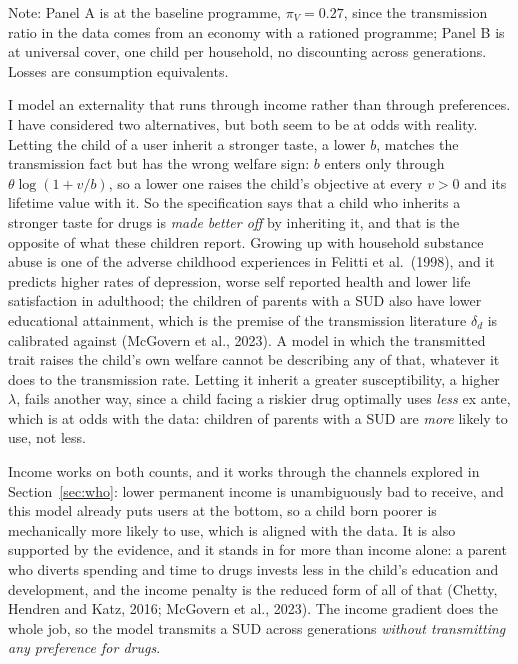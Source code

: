 \documentclass[10pt]{article}
\newcommand{\notes}[2]{\par\vspace{0.4em}%
  \begin{minipage}{#1}\footnotesize #2\end{minipage}}
\newcommand{\tabnote}[1]{\notes{\wd\ntbox}{#1}}
\begin{document}
\begin{table}[!tb]
\centering
\caption{The externality on children}\label{tab:children}
\sbox{\ntbox}{}\usebox{\ntbox}
\tabnote{Note: Panel A is at the baseline programme, $\pi_V=0.27$,
since the transmission ratio in the data comes from an economy with a rationed
programme; Panel B is at universal cover, one child per household, no
discounting across generations. Losses are consumption equivalents.}
\end{table}

I model an externality that runs through income rather than through
preferences. I have considered two alternatives, but both seem to be at odds
with reality. Letting the child of a user inherit a stronger taste, a lower $b$,
matches the transmission fact but has the wrong welfare sign: $b$ enters only
through $\theta\log(1+v/b)$, so a lower one raises the child's objective at every
$v>0$ and its lifetime value with it. So the specification says that a child
who inherits a stronger taste for drugs is \emph{made better off} by inheriting
it, and that is the opposite of what these children report. Growing up with
household substance abuse is one of the adverse childhood experiences in Felitti
et al.\ (1998), and it predicts higher rates of depression, worse self reported
health and lower life satisfaction in adulthood; the children of parents with a
SUD also have lower educational attainment, which is the premise of the
transmission literature $\delta_d$ is calibrated against (McGovern et al., 2023).
A model in which the transmitted trait raises the child's own welfare cannot be
describing any of that, whatever it does to the transmission rate. Letting it inherit a greater
susceptibility, a higher $\lambda$, fails another way, since a child facing a
riskier drug optimally uses \emph{less} ex ante, which is at odds with the
data: children of parents with a SUD are \emph{more} likely to use, not less.

Income works on both counts, and it works through the channels explored in
Section~\ref{sec:who}: lower permanent income is unambiguously bad to receive,
and this model already puts users at the bottom, so a child born poorer is
mechanically more likely to use, which is aligned with the data. It is also
supported by the evidence, and it stands in for more than income alone: a parent
who diverts spending and time to drugs invests less in the child's education and
development, and the income penalty is the reduced form of all of that (Chetty,
Hendren and Katz, 2016; McGovern et al., 2023). The income
gradient does the whole job, so the model transmits a SUD across generations
\emph{without transmitting any preference for drugs}.
\end{document}
